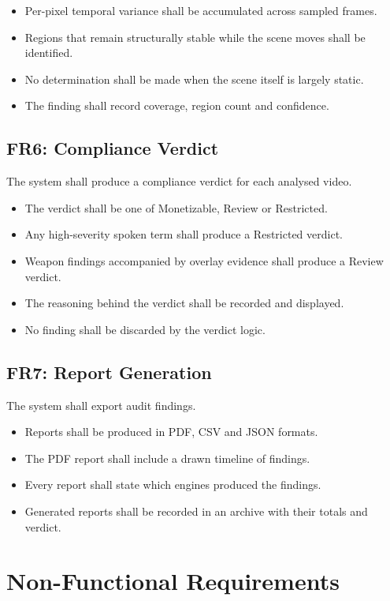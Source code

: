 \documentclass[12pt,a4paper,twoside]{report}
\begin{document}
\begin{itemize}
\item Per-pixel temporal variance shall be accumulated across sampled frames.
\item Regions that remain structurally stable while the scene moves shall be identified.
\item No determination shall be made when the scene itself is largely static.
\item The finding shall record coverage, region count and confidence.
\end{itemize}

\subsection{FR6: Compliance Verdict}

The system shall produce a compliance verdict for each analysed video.

\begin{itemize}
\item The verdict shall be one of Monetizable, Review or Restricted.
\item Any high-severity spoken term shall produce a Restricted verdict.
\item Weapon findings accompanied by overlay evidence shall produce a Review verdict.
\item The reasoning behind the verdict shall be recorded and displayed.
\item No finding shall be discarded by the verdict logic.
\end{itemize}

\subsection{FR7: Report Generation}

The system shall export audit findings.

\begin{itemize}
\item Reports shall be produced in PDF, CSV and JSON formats.
\item The PDF report shall include a drawn timeline of findings.
\item Every report shall state which engines produced the findings.
\item Generated reports shall be recorded in an archive with their totals and verdict.
\end{itemize}

\section{Non-Functional Requirements}
\end{document}
